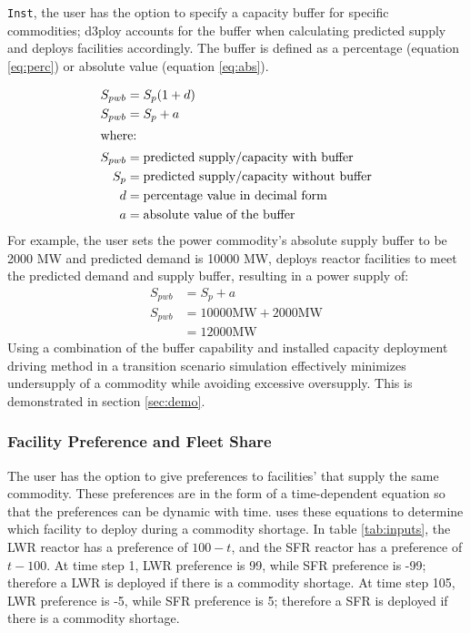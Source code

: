     \noindent 
    \texttt{Inst},
    the user has the option to specify a capacity buffer for specific 
    commodities; d3ploy accounts for the buffer when calculating predicted 
    supply and deploys facilities accordingly. 
    The buffer is defined as a percentage (equation \ref{eq:perc}) 
    or absolute value (equation \ref{eq:abs}). 
    
    \begin{align}
        \label{eq:perc}
        S_{pwb} &= S_{p}(1+d)\\
        \label{eq:abs}
        S_{pwb} &= S_{p}+a \\
        \intertext{where:}
        S_{pwb} &= \mbox{predicted supply/capacity with buffer} \nonumber\\
        S_p &= \mbox{predicted supply/capacity without buffer} \nonumber\\
        d &= \mbox{percentage value in decimal form} \nonumber\\
        a &= \mbox{absolute value of the buffer} \nonumber
    \end{align}
    For example, the user sets the power commodity's absolute supply buffer 
    to be 2000 MW and predicted demand is 10000 MW, \deploy deploys reactor 
    facilities to meet the predicted demand and supply buffer, resulting 
    in a power supply of: 
    \begin{align*}
        S_{pwb} &= S_{p}+a \\
        S_{pwb} &= 10000 \mbox{MW}+2000 \mbox{MW} \\
        &= 12000\mbox{MW}
    \end{align*}
    Using a combination of the buffer capability and  
    installed capacity deployment driving method in a transition 
    scenario simulation effectively minimizes undersupply of a 
    commodity while avoiding excessive oversupply. 
    This is demonstrated in section \ref{sec:demo}. 
    
    \subsubsection{\textbf{Facility Preference and Fleet Share}}
    The user has the option to give preferences to facilities' 
    that supply the same commodity. 
    These preferences are in the form of a time-dependent 
    equation so that the preferences can be dynamic with time. 
    \deploy uses these equations to determine which facility 
    to deploy during a commodity shortage.  
    In table \ref{tab:inputs}, 
    the \gls{LWR} reactor has a preference of $100-t$, and the 
    \gls{SFR} reactor has a preference of $t-100$. 
    At time step 1, LWR preference is 99, while SFR preference is -99; 
    therefore a LWR is deployed if there is a commodity shortage. 
    At time step 105, LWR preference is -5, while SFR preference is 5; 
    therefore a SFR is deployed if there is a commodity shortage. 

